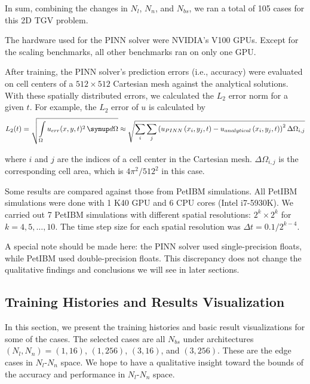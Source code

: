 In sum, combining the changes in $N_l$, $N_n$, and $N_{bs}$, we ran a total of 105 cases for this 2D TGV problem.

The hardware used for the PINN solver were NVIDIA's V100 GPUs.
Except for the scaling benchmarks, all other benchmarks ran on only one GPU.

After training, the PINN solver's prediction errors (i.e., accuracy) were evaluated on cell centers of a $512 \times 512$ Cartesian mesh against the analytical solutions.
With these spatially distributed errors, we calculated the $L_2$ error norm for a given $t$.
For example, the $L_2$ error of $u$ is calculated by
\begin{equation}\label{eq:l2norm}
    L_2(t)
    =
    \sqrt{\int\limits_{\Omega} u_{err}(x, y, t)^2 \diff\Omega}
    \approx
    \sqrt{\sum\limits_{i}\sum\limits_{j} \left(u_{PINN}\left(x_i, y_j, t\right)-u_{analytical}\left(x_i, y_j, t\right)\right)^2 \Delta \Omega_{i, j}}
\end{equation}

\noindent where $i$ and $j$ are the indices of a cell center in the Cartesian mesh. $\Delta\Omega_{i,j}$ is the corresponding cell area, which is $4\pi^2/512^2$ in this case.

Some results are compared against those from PetIBM simulations.
All PetIBM simulations were done with 1 K40 GPU and 6 CPU cores (Intel i7-5930K).
We carried out 7 PetIBM simulations with different spatial resolutions: $2^k\times 2^k$ for $k=4, 5, \dots, 10$.
The time step size for each spatial resolution was $\Delta t=0.1/2^{k-4}$.

A special note should be made here: the PINN solver used single-precision floats, while PetIBM used double-precision floats.
This discrepancy does not change the qualitative findings and conclusions we will see in later sections.

\subsection{Training Histories and Results Visualization}

In this section, we present the training histories and basic result visualizations for some of the cases.
The selected cases are all $N_{bs}$ under architectures $(N_l, N_n)=(1, 16)$, $(1, 256)$, $(3, 16)$, and $(3, 256)$.
These are the edge cases in $N_l$-$N_n$ space.
We hope to have a qualitative insight toward the bounds of the accuracy and performance in $N_l$-$N_n$ space.


